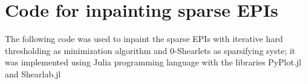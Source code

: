 \chapter{Code for inpainting sparse EPIs}
\label{sec:AppendixC}

The following code was used to inpaint the sparse EPIs with iterative hard thresholding as minimization algorithm and $0$-Shearlets as sparsifying syste; it was implemented using Julia programming language with the libraries PyPlot.jl and Shearlab.jl




